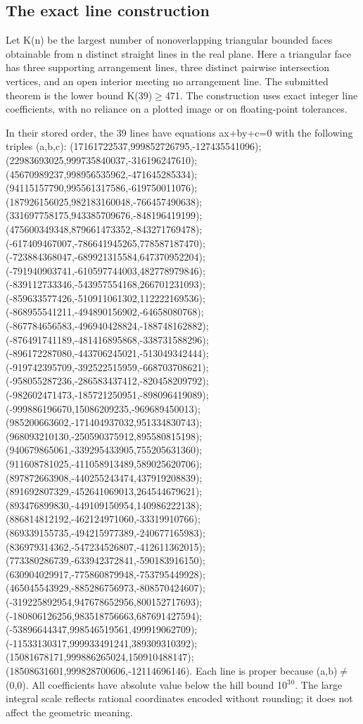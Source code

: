 \documentclass[11pt,a4paper]{article}
\begin{document}
\subsection{The exact line construction}
Let K(n) be the largest number of nonoverlapping triangular bounded faces obtainable from n distinct straight lines in the real plane. Here a triangular face has three supporting arrangement lines, three distinct pairwise intersection vertices, and an open interior meeting no arrangement line. The submitted theorem is the lower bound K(39)\ensuremath{\geq}471. The construction uses exact integer line coefficients, with no reliance on a plotted image or on floating-point tolerances.

In their stored order, the 39 lines have equations ax+by+c=0 with the following triples (a,b,c): (17161722537,999852726795,-127435541096); (22983693025,999735840037,-316196247610); (45670989237,998956535962,-471645285334); (94115157790,995561317586,-619750011076); (187926156025,982183160048,-766457490638); (331697758175,943385709676,-848196419199); (475600349348,879661473352,-843271769478); (-617409467007,-786641945265,778587187470); (-723884368047,-689921315584,647370952204); (-791940903741,-610597744003,482778979846); (-839112733346,-543957554168,266701231093); (-859633577426,-510911061302,112222169536); (-868955541211,-494890156902,-64658080768); (-867784656583,-496940428824,-188748162882); (-876491741189,-481416895868,-338731588296); (-896172287080,-443706245021,-513049342444); (-919742395709,-392522515959,-668703708621); (-958055287236,-286583437412,-820458209792); (-982602471473,-185721250951,-898096419089); (-999886196670,15086209235,-969689450013); (985200663602,-171404937032,951334830743); (968093210130,-250590375912,895580815198); (940679865061,-339295433905,755205631360); (911608781025,-411058913489,589025620706); (897872663908,-440255243474,437919208839); (891692807329,-452641069013,264544679621); (893476899830,-449109150954,140986222138); (886814812192,-462124971060,-33319910766); (869339155735,-494215977389,-240677165983); (836979314362,-547234526807,-412611362015); (773380286739,-633942372841,-590183916150); (630904029917,-775860879948,-753795449928); (465045543929,-885286756973,-808570424607); (-319225892954,947678652956,800152717693); (-180806126256,983518756663,687691427594); (-53896644347,998546519561,499919062709); (-11533130317,999933491241,389309310392); (15081678171,999886265024,150910488147); (18508631601,999828700606,-12114696146). Each line is proper because (a,b)\ensuremath{\neq}(0,0). All coefficients have absolute value below the hill bound 10\ensuremath{^3}\ensuremath{^0}. The large integral scale reflects rational coordinates encoded without rounding; it does not affect the geometric meaning.
\end{document}
